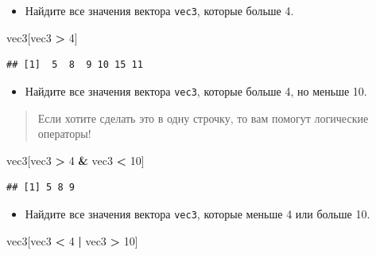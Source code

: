 \documentclass[]{book}
\newenvironment{Shaded}{\begin{snugshade}}{\end{snugshade}}
\newcommand{\DecValTok}[1]{\textcolor[rgb]{0.00,0.00,0.81}{#1}}
\newcommand{\StringTok}[1]{\textcolor[rgb]{0.31,0.60,0.02}{#1}}
\newcommand{\OperatorTok}[1]{\textcolor[rgb]{0.81,0.36,0.00}{\textbf{#1}}}
\newcommand{\NormalTok}[1]{#1}
\providecommand{\tightlist}{%
  \setlength{\itemsep}{0pt}\setlength{\parskip}{0pt}}
\begin{document}
\begin{itemize}
\tightlist
\item
  Найдите все значения вектора \texttt{vec3}, которые больше 4.
\end{itemize}

\begin{Shaded}
\begin{Highlighting}[]
\NormalTok{vec3[vec3 }\OperatorTok{>}\StringTok{ }\DecValTok{4}\NormalTok{]}
\end{Highlighting}
\end{Shaded}

\begin{verbatim}
## [1]  5  8  9 10 15 11
\end{verbatim}

\begin{itemize}
\tightlist
\item
  Найдите все значения вектора \texttt{vec3}, которые больше 4, но
  меньше 10.
\end{itemize}

\begin{quote}
Если хотите сделать это в одну строчку, то вам помогут логические
операторы!
\end{quote}

\begin{Shaded}
\begin{Highlighting}[]
\NormalTok{vec3[vec3 }\OperatorTok{>}\StringTok{ }\DecValTok{4} \OperatorTok{&}\StringTok{ }\NormalTok{vec3 }\OperatorTok{<}\StringTok{ }\DecValTok{10}\NormalTok{]}
\end{Highlighting}
\end{Shaded}

\begin{verbatim}
## [1] 5 8 9
\end{verbatim}

\begin{itemize}
\tightlist
\item
  Найдите все значения вектора \texttt{vec3}, которые меньше 4 или
  больше 10.
\end{itemize}

\begin{Shaded}
\begin{Highlighting}[]
\NormalTok{vec3[vec3 }\OperatorTok{<}\StringTok{ }\DecValTok{4} \OperatorTok{|}\StringTok{ }\NormalTok{vec3 }\OperatorTok{>}\StringTok{ }\DecValTok{10}\NormalTok{]}
\end{Highlighting}
\end{Shaded}
\end{document}
